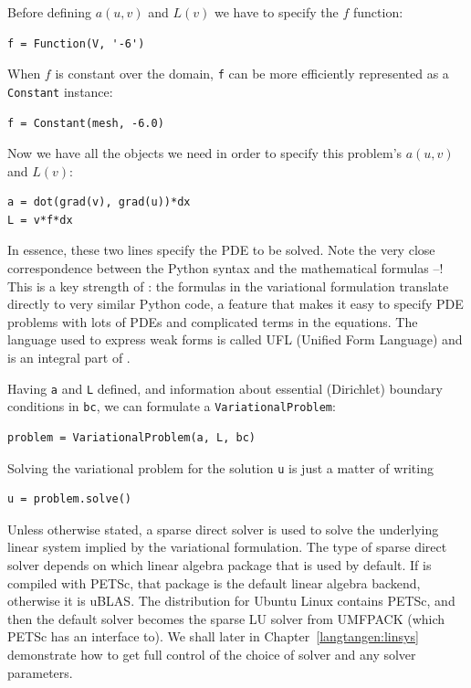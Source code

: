 Before defining $a(u,v)$ and $L(v)$ we have to specify the $f$ function:
\begin{Verbatim}[fontsize=\fontsize{10pt}{10pt},tabsize=8,baselinestretch=1.05,
fontfamily=tt,xleftmargin=7mm]
f = Function(V, '-6')
\end{Verbatim}
\noindent
When $f$ is constant over the domain, {\fontsize{12pt}{12pt}\texttt{f}} can be
more efficiently represented as a {\fontsize{12pt}{12pt}\texttt{Constant}} instance:
\begin{Verbatim}[fontsize=\fontsize{10pt}{10pt},tabsize=8,baselinestretch=1.05,
fontfamily=tt,xleftmargin=7mm]
f = Constant(mesh, -6.0)
\end{Verbatim}
\noindent
Now we have all the objects we need in order to specify this problem's
$a(u,v)$ and $L(v)$:
\begin{Verbatim}[fontsize=\fontsize{10pt}{10pt},tabsize=8,baselinestretch=1.05,
fontfamily=tt,xleftmargin=7mm]
a = dot(grad(v), grad(u))*dx
L = v*f*dx
\end{Verbatim}
\noindent
In essence, these two lines specify the PDE to be solved.
Note the very close correspondence between the Python syntax
and the mathematical formulas --!
This is a key strength of \fenics: the formulas in the variational
formulation translate directly to very similar Python code, a feature
that makes it easy to specify PDE problems with lots of PDEs and
complicated terms in the equations.
The language used to express weak forms is called UFL (Unified Form Language)
and is an integral part of \fenics.

Having {\fontsize{12pt}{12pt}\verb!a!} and {\fontsize{12pt}{12pt}\verb!L!} defined, and information about essential
(Dirichlet) boundary conditions in {\fontsize{12pt}{12pt}\verb!bc!}, we can formulate a
{\fontsize{12pt}{12pt}\verb!VariationalProblem!}:
\begin{Verbatim}[fontsize=\fontsize{10pt}{10pt},tabsize=8,baselinestretch=1.05,
fontfamily=tt,xleftmargin=7mm]
problem = VariationalProblem(a, L, bc)
\end{Verbatim}
\noindent
Solving the variational problem for the solution {\fontsize{12pt}{12pt}\verb!u!} is just a
matter of writing
\begin{Verbatim}[fontsize=\fontsize{10pt}{10pt},tabsize=8,baselinestretch=1.05,
fontfamily=tt,xleftmargin=7mm]
u = problem.solve()
\end{Verbatim}
\noindent
Unless otherwise stated, a sparse direct solver is used to solve the underlying
linear system implied by the variational formulation. The type
of sparse direct solver depends on which linear algebra package
that is used by default. If \dolfin{} is compiled with PETSc, that package
is the default linear algebra backend, otherwise it is uBLAS.
The \fenics{} distribution for Ubuntu Linux contains PETSc, and then
the default solver becomes the sparse LU solver from UMFPACK (which
PETSc has an interface to). We shall later in Chapter~\ref{langtangen:linsys}
demonstrate how to get
full control of the choice of solver and any solver parameters.

